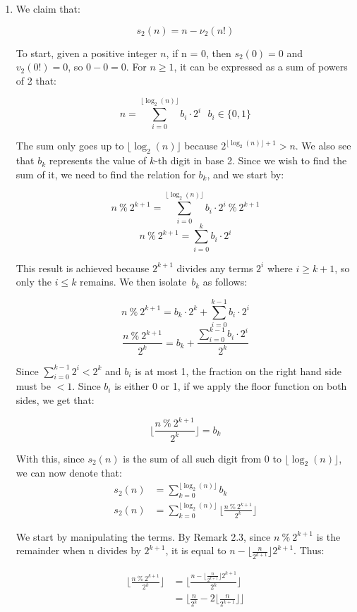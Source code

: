 \documentclass{article}
\begin{document}
\begin{enumerate}[leftmargin=*, label=\arabic*.]
\begin{enumerate}[label=\alph*)]
    \item
    We claim that:

    $$s_2(n) = n - \nu_2(n!)$$

    To start, given a positive integer $n$, if n = 0, then $s_2(0) = 0$ and $v_2(0!) = 0$, so $0 - 0 = 0$. For $n \geq 1$, it can be expressed as a sum of powers of 2 that: 

    $$n = \sum_{i=0}^{\lfloor \log_2(n) \rfloor} b_i \cdot 2^i \ \ \ b_i \in \{0, 1\}$$

    The sum only goes up to $\lfloor \log_2(n) \rfloor$ because $2^{\lfloor \log_2(n) \rfloor + 1} > n$. We also see that $b_k$ represents the value of $k$-th digit in base 2. Since we wish to find the sum of it, we need to find the relation for $b_k$, and we start by: 
    
    $$n  \ \% \ 2^{k+1} = \sum_{i=0}^{\lfloor \log_2(n) \rfloor} b_i \cdot 2^i  \ \% \ 2^{k+1}$$
    $$n \ \% \ 2^{k+1} = \sum_{i=0}^{k} b_i \cdot 2^i $$

    This result is achieved because $2^{k + 1}$ divides any terms $2^i$ where $i \geq k + 1$, so only the $i \leq k$ remains. We then isolate\ $b_k$ as follows: 

    $$n \ \% \ 2^{k+1} = b_k \cdot 2^k + \sum_{i=0}^{k-1} b_i \cdot 2^i $$
    $$\frac{n \ \% \ 2^{k+1}}{2^k} = b_k + \frac{\sum_{i=0}^{k-1} b_i \cdot 2^i}{2^k} $$

    Since $\sum_{i=0}^{k-1} 2^i < 2^k$ and $b_i$ is at most 1, the fraction on the right hand side must be $< 1$. Since $b_i$ is either 0 or 1, if we apply the floor function on both sides, we get that: 

    $$\lfloor \frac{n \ \% \ 2^{k+1}}{2^k} \rfloor = b_k$$

    With this, since $s_2(n)$ is the sum of all such digit from 0 to $\lfloor \log_2(n) \rfloor$, we can now denote that: 
    \begin{align*}
    s_2(n) &= \sum_{k=0}^{\lfloor \log_2(n) \rfloor} b_k\\
    s_2(n) &= \sum_{k=0}^{\lfloor \log_2(n) \rfloor} \lfloor \frac{n \ \% \ 2^{k+1}}{2^k} \rfloor
    \end{align*}
    
    We start by manipulating the terms. By Remark 2.3, since $n \ \% \ 2^{k+1}$
    is the remainder when n divides by $2^{k+1}$, it is equal to $n - \lfloor \frac{n}{2^{k+1}}\rfloor2^{k+1}$. Thus: 

    \begin{align*}
    \lfloor \frac{n \ \% \ 2^{k+1}}{2^k} \rfloor &= \lfloor \frac{n - \lfloor \frac{n}{2^{k+1}}\rfloor2^{k+1}}{2^k} \rfloor\\
    &= \lfloor \frac{n}{2^k} - 2\lfloor \frac{n}{2^{k+1}} \rfloor \rfloor  
    \end{align*}


\end{enumerate}
\end{enumerate}
\end{document}
